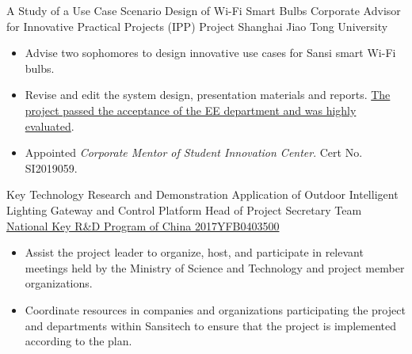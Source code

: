 \documentclass[11pt,a4paper]{moderncv}
\begin{document}
{A Study of a Use Case Scenario Design of Wi-Fi Smart Bulbs}
{Corporate Advisor for Innovative Practical Projects (IPP) Project}
{Shanghai Jiao Tong University}{}
{
\begin{itemize}
	\item Advise two sophomores to design innovative use cases for Sansi smart Wi-Fi bulbs.
	\item Revise and edit the system design, presentation materials and reports. \href{https://bingcheng1998.github.io/zh-CN/制作/sansi全彩灯泡的app设计.html}{The project passed the acceptance of the EE department and was highly evaluated}.
	\item Appointed \textit{Corporate Mentor of Student Innovation Center}. Cert No. SI2019059.
\end{itemize}
}

{Key Technology Research and Demonstration Application of Outdoor Intelligent Lighting Gateway and Control Platform}
{Head of Project Secretary Team}
{\href{http://service.most.gov.cn/u/cms/static/201706/05145323ywhn.pdf}{National Key R\&D Program of China 2017YFB0403500}}{}
{
\begin{itemize}
	\item Assist the project leader to organize, host, and participate in relevant meetings held by the Ministry of Science and Technology and project member organizations.
	\item Coordinate resources in companies and organizations participating the project and departments within Sansitech to ensure that the project is implemented according to the plan.
\end{itemize}
}


\end{document}
